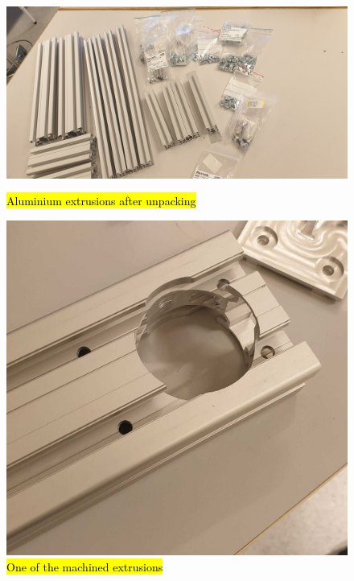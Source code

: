 \begin{figure}[h]
	\centering
	\begin{minipage}[t]{0.4\linewidth}
		\centering
		\includegraphics[width=1\linewidth]{4-experiment-design/img/mechanical/extr.jpg}
		\caption{\hl{Aluminium extrusions after unpacking}}
		\label{fig::mechanical::extrusions}
	\end{minipage}
	\hspace{0.05\linewidth}
	\begin{minipage}[t]{0.4\linewidth}
		\centering
		\includegraphics[width=0.65\linewidth]{4-experiment-design/img/mechanical/ext-mach.jpg}
		\caption{\hl{One of the machined extrusions}}
		\label{fig::mechanical::mach-extr}
	\end{minipage}
\end{figure}
